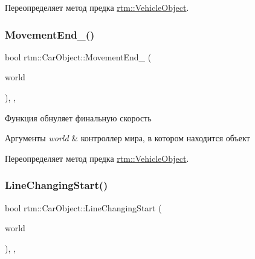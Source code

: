 Переопределяет метод предка \hyperlink{classrtm_1_1_vehicle_object_a06a920b3fe0df4fa4ca0687a9366426a}{rtm\+::\+Vehicle\+Object}.

\mbox{\label{classrtm_1_1_car_object_a24354013f953386699bbb3f4464adb0c}} 
\subsubsection{\texorpdfstring{Movement\+End\+\_\+()}{MovementEnd\_()}}
{\footnotesize\ttfamily bool rtm\+::\+Car\+Object\+::\+Movement\+End\+\_\+ (\begin{DoxyParamCaption}\item[{\hyperlink{classrtm_1_1_world_controller}{World\+Controller} $\ast$const}]{world }\end{DoxyParamCaption})\hspace{0.3cm}{\ttfamily [override]}, {\ttfamily [protected]}, {\ttfamily [virtual]}}

Функция обнуляет финальную скорость 
\begin{DoxyParams}{Аргументы}
{\em world} & контроллер мира, в котором находится объект \\
\hline
\end{DoxyParams}


Переопределяет метод предка \hyperlink{classrtm_1_1_vehicle_object_a7e6c94902d1d544006ca8de63ba36860}{rtm\+::\+Vehicle\+Object}.

\mbox{\label{classrtm_1_1_car_object_a34063664a03d36d1308c80e064d1ae61}} 
\subsubsection{\texorpdfstring{Line\+Changing\+Start()}{LineChangingStart()}}
{\footnotesize\ttfamily bool rtm\+::\+Car\+Object\+::\+Line\+Changing\+Start (\begin{DoxyParamCaption}\item[{\hyperlink{classrtm_1_1_world_controller}{World\+Controller} $\ast$const}]{world }\end{DoxyParamCaption})\hspace{0.3cm}{\ttfamily [override]}, {\ttfamily [protected]}, {\ttfamily [virtual]}}

